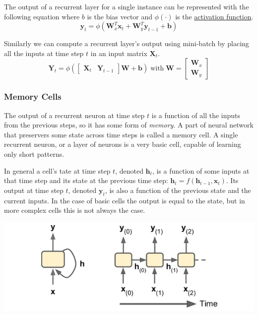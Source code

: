 \documentclass[12pt]{article}
\begin{document}
        The output of a recurrent layer for a single instance can be represented with the following equation where $b$
        is the bias vector and $\phi(\cdot)$ is the \hyperref[sec:ActivationFunction]{activation function}.
        $$ \boldsymbol{y}_t = \phi(\boldsymbol{W}_x^T \boldsymbol{x}_t + \boldsymbol{W}_y^T \boldsymbol{y}_{t-1} + \boldsymbol{b}) $$

        Similarly we can compute a recurrent layer's output using mini-batch by placing all the inputs at time step $t$
        in an input matrix $\boldsymbol{X}_t$.
        $$ \boldsymbol{Y}_t = \phi( \begin{bmatrix} \boldsymbol{X}_t & \boldsymbol{Y}_{t-1} \end{bmatrix} \boldsymbol{W}
        + \boldsymbol{b}) \; \text{with} \; \boldsymbol{W} = \begin{bmatrix} \boldsymbol{W}_x \\ \boldsymbol{W}_y
        \end{bmatrix} $$
        
        \subsubsection{Memory Cells}
            The output of a recurrent neuron at time step $t$ is a function of all the inputs from the previous steps,
            so it has some form of \textit{memory}. A part of neural network that preservers some state across time
            steps is called a memory cell. A single recurrent neuron, or a layer of neurons is a very basic cell,
            capable of learning only short patterns.

            In general a cell's tate at time step $t$, denoted $\boldsymbol{h}_t$, is a function of some inputs at that
            time step and its state at the previous time step: $\boldsymbol{h}_t = f(\boldsymbol{h}_{t-1},
            \boldsymbol{x}_t)$. Its output at time step $t$, denoted $\boldsymbol{y}_t$, is also a function of the
            previous state and the current inputs. In the case of basic cells the output is equal to the state, but in
            more complex cells this is not always the case.

            \begin{center}
                \includegraphics[scale=0.65]{MemCell}
            \end{center}
        
\end{document}
